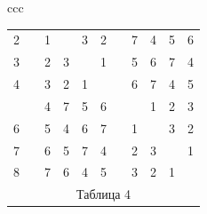\begin{center}
\begin{tabular}{ccc}
\begin{tabular}{ccccccccccc}
2 & \vline & 1 & \ & 3 & 2 & \vline & 7 & 4 & 5 & 6 \\


3 & \vline & 2 & 3 & \ & 1 & \vline & 5 & 6 & 7 & 4 \\


4 & \vline & 3 & 2 & 1 & \ & \vline & 6 & 7 & 4 & 5 \\


\hline


 5 & \vline & 4 & 7 & 5 & 6 & \vline & \ & 1 & 2 & 3 \\


6 & \vline & 5 & 4 & 6 & 7 & \vline & 1 & \ & 3 & 2 \\


7 & \vline & 6 & 5 & 7 & 4 & \vline & 2 & 3 & \ & 1 \\


8 & \vline & 7 & 6 & 4 & 5 & \vline & 3 & 2 & 1 & \ \\


\multicolumn{11}{c}{ Таблица 4}


\end{tabular}





\end{tabular}


\end{center}


\smallskip





